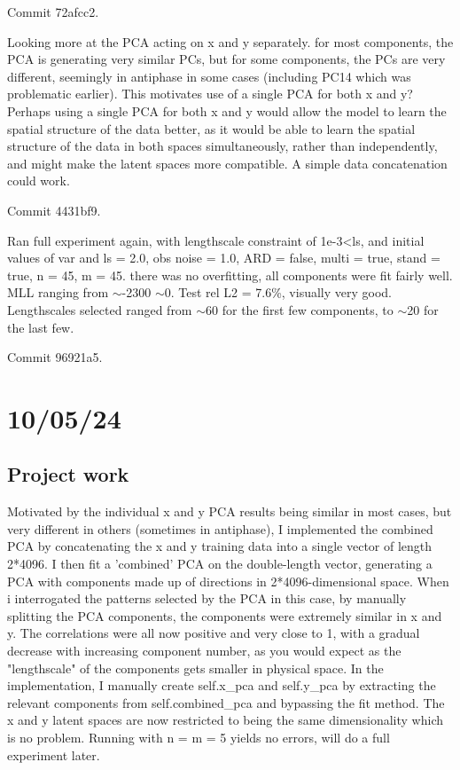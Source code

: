 \documentclass[11pt,a4paper]{article}
\begin{document}
Commit 72afcc2.

Looking more at the PCA acting on x and y separately.
for most components, the PCA is generating very similar PCs, but for some components, the PCs are very different, seemingly in antiphase in some cases (including PC14 which was problematic earlier).
This motivates use of a single PCA for both x and y? 
Perhaps using a single PCA for both x and y would allow the model to learn the spatial structure of the data better, as it would be able to learn the spatial structure of the data in both spaces simultaneously, rather than independently, and might make the latent spaces more compatible.
A simple data concatenation could work.

Commit 4431bf9.

Ran full experiment again, with lengthscale constraint of 1e-3\textless ls, and initial values of var and ls = 2.0, obs noise = 1.0, ARD = false, multi = true, stand = true, n = 45, m = 45.
there was no overfitting, all components were fit fairly well. 
MLL ranging from $\sim$-2300 \- $\sim$0.
Test rel L2 = 7.6\%, visually very good.
Lengthscales selected ranged from $\sim$60 for the first few components, to $\sim$20 for the last few.

Commit 96921a5.

\section{10/05/24}

\subsection{Project work}

Motivated by the individual x and y PCA results being similar in most cases, but very different in others (sometimes in antiphase), I implemented the combined PCA by concatenating the x and y training data into a single vector of length 2*4096.
I then fit a 'combined' PCA on the double-length vector, generating a PCA with components made up of directions in 2*4096-dimensional space.
When i interrogated the patterns selected by the PCA in this case, by manually splitting the PCA components, the components were extremely similar in x and y.
The correlations were all now positive and very close to 1, with a gradual decrease with increasing component number, as you would expect as the "lengthscale" of the components gets smaller in physical space.
In the implementation, I manually create self.x_pca and self.y_pca by extracting the relevant components from self.combined_pca and bypassing the fit method.
The x and y latent spaces are now restricted to being the same dimensionality which is no problem.
Running with n = m = 5 yields no errors, will do a full experiment later.
\end{document}
